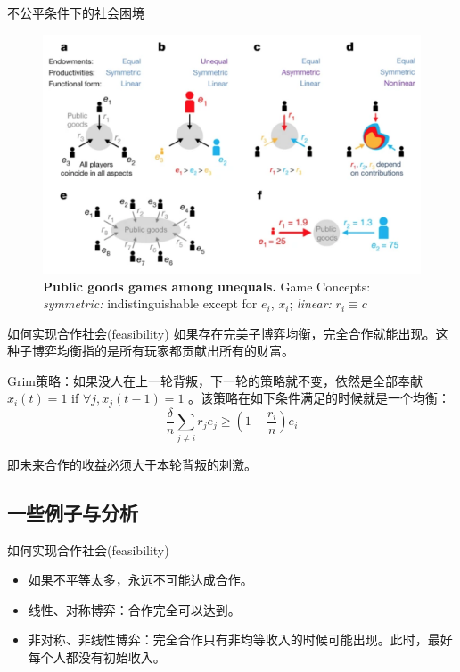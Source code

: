 \documentclass{beamer}
\begin{document}
\begin{frame}{不公平条件下的社会困境}
    \begin{figure}
        \centering
        \includegraphics[width = 0.8\linewidth]{figs/sketch}
        \caption{\textbf{Public goods games among unequals.} Game Concepts: \textit{symmetric:} indistinguishable except for $e_i$, $x_i$; \textit{linear:} $r_i\equiv c$ }
        \label{fig:sketch}
    \end{figure}
\end{frame}


\begin{frame}{如何实现合作社会(feasibility)}
    如果存在完美子博弈均衡，完全合作就能出现。这种子博弈均衡指的是所有玩家都贡献出所有的财富。
    
    Grim策略：如果没人在上一轮背叛，下一轮的策略就不变，依然是全部奉献 $x_i(t) = 1$ if $\forall j,x_j(t-1) = 1$ 。该策略在如下条件满足的时候就是一个均衡：\[\frac{\delta}{n}\sum_{j\ne i}r_je_j\geq (1-\frac{r_i}{n})e_i \]
    
    即未来合作的收益必须大于本轮背叛的刺激。
\end{frame}
\subsection{一些例子与分析}
\begin{frame}{如何实现合作社会(feasibility)}
    \begin{itemize}
        \item 如果不平等太多，永远不可能达成合作。
        \item 线性、对称博弈：合作完全可以达到。
        \item 非对称、非线性博弈：完全合作只有非均等收入的时候可能出现。此时，最好每个人都没有初始收入。
    \end{itemize}
\end{frame}
\end{document}
